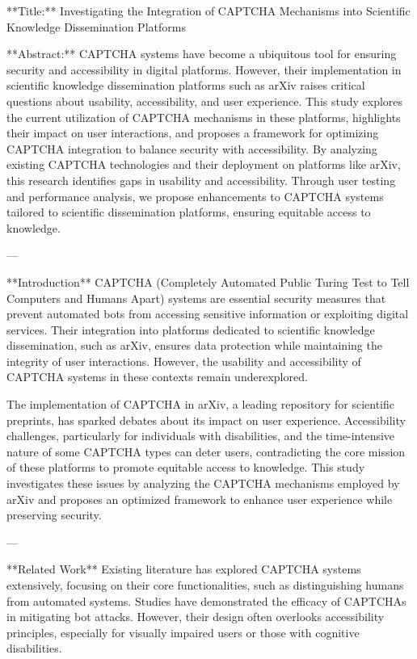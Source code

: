 **Title:** Investigating the Integration of CAPTCHA Mechanisms into Scientific Knowledge Dissemination Platforms

**Abstract:**  
CAPTCHA systems have become a ubiquitous tool for ensuring security and accessibility in digital platforms. However, their implementation in scientific knowledge dissemination platforms such as arXiv raises critical questions about usability, accessibility, and user experience. This study explores the current utilization of CAPTCHA mechanisms in these platforms, highlights their impact on user interactions, and proposes a framework for optimizing CAPTCHA integration to balance security with accessibility. By analyzing existing CAPTCHA technologies and their deployment on platforms like arXiv, this research identifies gaps in usability and accessibility. Through user testing and performance analysis, we propose enhancements to CAPTCHA systems tailored to scientific dissemination platforms, ensuring equitable access to knowledge.

---

**Introduction**  
CAPTCHA (Completely Automated Public Turing Test to Tell Computers and Humans Apart) systems are essential security measures that prevent automated bots from accessing sensitive information or exploiting digital services. Their integration into platforms dedicated to scientific knowledge dissemination, such as arXiv, ensures data protection while maintaining the integrity of user interactions. However, the usability and accessibility of CAPTCHA systems in these contexts remain underexplored.

The implementation of CAPTCHA in arXiv, a leading repository for scientific preprints, has sparked debates about its impact on user experience. Accessibility challenges, particularly for individuals with disabilities, and the time-intensive nature of some CAPTCHA types can deter users, contradicting the core mission of these platforms to promote equitable access to knowledge. This study investigates these issues by analyzing the CAPTCHA mechanisms employed by arXiv and proposes an optimized framework to enhance user experience while preserving security.

---

**Related Work**  
Existing literature has explored CAPTCHA systems extensively, focusing on their core functionalities, such as distinguishing humans from automated systems. Studies have demonstrated the efficacy of CAPTCHAs in mitigating bot attacks. However, their design often overlooks accessibility principles, especially for visually impaired users or those with cognitive disabilities.

